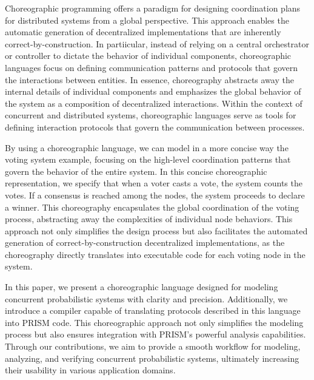 Choreographic programming offers a paradigm for designing coordination plans for distributed systems from a global perspective. This approach enables the automatic generation of decentralized implementations that are inherently correct-by-construction.
In partiicular, instead of relying on a central orchestrator or controller to dictate the behavior of individual components, choreographic languages focus on defining communication patterns and protocols that govern the interactions between entities.
In essence, choreography abstracts away the internal details of individual components and emphasizes the global behavior of the system as a composition of decentralized interactions. Within the context of concurrent and distributed systems, choreographic languages serve as tools for defining interaction protocols that govern the communication between processes. 

By using a choreographic language, we can model in a more concise way the voting system example, focusing on the high-level coordination patterns that govern the behavior of the entire system. In this concise choreographic representation, we specify that when a voter casts a vote, the system counts the votes. If a consensus is reached among the nodes, the system proceeds to declare a winner. This choreography encapsulates the global coordination of the voting process, abstracting away the complexities of individual node behaviors. This approach not only simplifies the design process but also facilitates the automated generation of correct-by-construction decentralized implementations, as the choreography directly translates into executable code for each voting node in the system.

In this paper, we present a choreographic language designed for modeling concurrent probabilistic systems with clarity and precision. Additionally, we introduce a compiler capable of translating protocols described in this language into PRISM code. This choreographic approach not only simplifies the modeling process but also ensures integration with PRISM's powerful analysis capabilities. Through our contributions, we aim to provide a smooth workflow for modeling, analyzing, and verifying concurrent probabilistic systems, ultimately increasing their usability in various application domains. 

